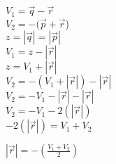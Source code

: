 \documentclass[10pt, a4paper]{article}
\begin{document}
\begin{enumerate}
        \begin{center}
            $V_1= \vec{q} -\vec{r}$\\
            $V_2= -(\vec{p} + \vec{r}$)\\
            $z = |\vec{q}| = |\vec{p}|$\\
            $V_1 = z - |\vec{r}|$\\
            $z = V_1 + |\vec{r}|$\\
            $V_2 = -(V_1 + |\vec{r}|) - |\vec{r}|$\\
            $V_2 = -V_1 - |\vec{r}| - |\vec{r}|$\\
            $V_2 = -V_1 - 2(|\vec{r}|)$\\
            $- 2(|\vec{r}|)= V_1 + V_2$
            
            $|\vec{r}|= -(\frac{V_1 + V_2}{2})$
        
        \end{center}

    \end{enumerate}
\end{document}
